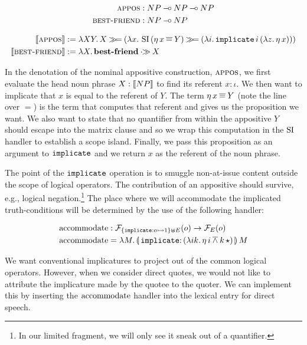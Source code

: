 \documentclass{llncs}
\newcommand{\negSpaceBeforeAlign}{\vspace{-4mm}}
\newcommand{\negSpaceBetweenAlign}{\vspace{-8mm}}
\begin{document}
\negSpaceBeforeAlign

\begin{align*}
  \textsc{appos} &: NP \mathbin{{-}\mkern-3.5mu{\circ}} NP \mathbin{{-}\mkern-3.5mu{\circ}} NP \\
  \textsc{best-friend} &: NP \mathbin{{-}\mkern-3.5mu{\circ}} NP
\end{align*}

\negSpaceBetweenAlign

\begin{align*}
  \llbracket \textsc{appos} \rrbracket &:= \lambda X Y.\, X \mathbin{\gg\!=} (\lambda x.\, \operatorname{SI}\,(\eta\,x
          \mathbin{\overline{=}} Y) \mathbin{\gg\!=}
        (\lambda i.\, \mathtt{implicate}\,i\,(\lambda z.\, \eta\,x))) \\
  \llbracket \textsc{best-friend} \rrbracket &:= \lambda X.\, \textbf{best-friend} \mathbin{\cdot\!\!\gg} X
\end{align*}

In the denotation of the nominal appositive construction, $\textsc{appos}$, we
first evaluate the head noun phrase $X : \llbracket NP \rrbracket$ to find its referent $x
: \iota$. We then want to implicate that $x$ is equal to the referent of
$Y$. The term $\eta\,x \mathbin{\overline{=}} Y$ (note the line over $=$)
is the term that computes that referent and gives us the proposition we
want. We also want to state that no quantifier from within the appositive
$Y$ should escape into the matrix clause and so we wrap this computation in
the $\operatorname{SI}$ handler to establish a scope island. Finally, we pass this
proposition as an argument to $\mathtt{implicate}$ and we return $x$ as the
referent of the noun phrase.

The point of the $\mathtt{implicate}$ operation is to smuggle non-at-issue
content outside the scope of logical operators. The contribution of an
appositive should survive, e.g., logical negation.\footnote{In our limited
  fragment, we will only see it sneak out of a quantifier.} The place where
we will accommodate the implicated truth-conditions will be determined by
the use of the following handler:

\negSpaceBeforeAlign

\begin{align*}
  \accommodate &: \FF_{\{\typedop{implicate}{o}{1}\} \uplus E}(o) \to \FF_E(o) \\
  \accommodate &= \lam{M}{\ap{\banana{\onto{\op{implicate}}{(\lam{i
            k}{\etaE{i} \dand \ap{k}{\star}})}}}{M}}
\end{align*}

We want conventional implicatures to project out of the common logical
operators. However, when we consider direct quotes, we would not like to
attribute the implicature made by the quotee to the quoter. We can
implement this by inserting the $\operatorname{accommodate}$ handler into the lexical
entry for direct speech.
\end{document}

